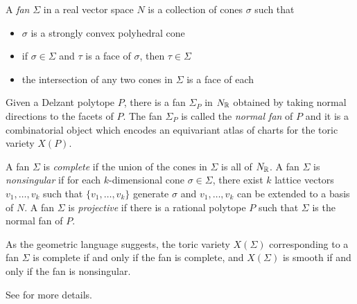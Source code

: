 \begin{definition}
    A \emph{fan} $\Sigma$ in a real vector space $N$ is a collection of cones
    $\sigma$ such that \begin{itemize}
        \item $\sigma$ is a strongly convex polyhedral cone
        \item if $\sigma\in\Sigma$ and $\tau$ is a face of $\sigma$, then $\tau\in\Sigma$
        \item the intersection of any two cones in $\Sigma$ is a face of each
    \end{itemize}
\end{definition}

Given a Delzant polytope $P$, there is a fan $\Sigma_P$ in $N_{\mathbb{R}}$ obtained by taking 
normal directions to the facets of $P$. The fan $\Sigma_P$ is called the \emph{normal fan} of $P$
and it is a combinatorial object which encodes an equivariant atlas of charts for the toric variety $X(P)$.

\begin{definition}
    A fan $\Sigma$ is \emph{complete} if the union of the cones in $\Sigma$ is all of $N_{\mathbb{R}}$.
    A fan $\Sigma$ is \emph{nonsingular} if for each $k$-dimensional cone $\sigma\in\Sigma$,
    there exist $k$ lattice vectors $v_1,\dots,v_k$ such that $\{v_1,\dots,v_k\}$ generate $\sigma$
    and $v_1,\dots,v_k$ can be extended to a basis of $N$.
    A fan $\Sigma$ is \emph{projective} if there is a rational polytope $P$ such that $\Sigma$ is the normal fan of $P$.
\end{definition}

As the geometric language suggests, the toric variety $X(\Sigma)$ 
corresponding to a fan $\Sigma$ is complete if and only if the fan is complete,
and $X(\Sigma)$ is smooth if and only if the fan is nonsingular.

See \cite{cls} for more details. 



